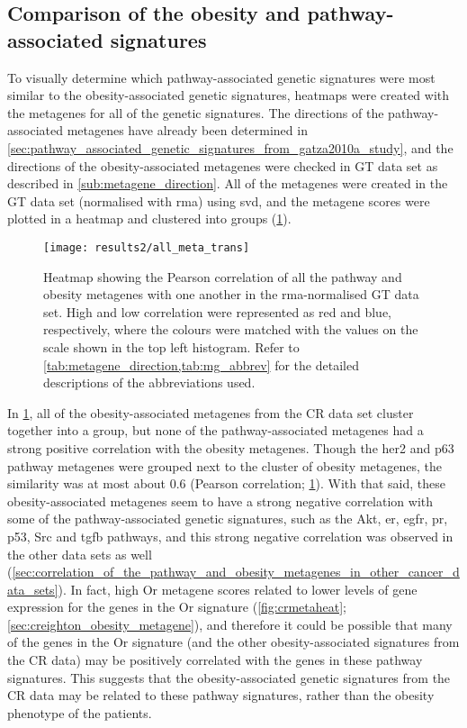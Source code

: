 \subsection{Comparison of the obesity and pathway-associated signatures}
\label{sub:comparison_of_the_obesity_and_pathway_associated_signatures}

To visually determine which pathway-associated genetic signatures were most similar to the obesity-associated genetic signatures, heatmaps were created with the metagenes for all of the genetic signatures.
The directions of the pathway-associated metagenes have already been determined in \cref{sec:pathway_associated_genetic_signatures_from_gatza2010a_study}, and the directions of the obesity-associated metagenes were checked in GT data set as described in \cref{sub:metagene_direction}.
All of the metagenes were created in the GT data set (normalised with \gls{rma}) using \gls{svd}, and the metagene scores were plotted in a heatmap and clustered into groups (\cref{fig:gatza_allmeta}).

\begin{figure}[tb]
	\centering
	\texttt{[image: results2/all\_meta\_trans]}
	\caption[Heatmap of the Pearson correlation of all the pathway and obesity metagenes with one another in the \acrshort{rma}-normalised GT data]{Heatmap showing the Pearson correlation of all the pathway and obesity metagenes  with one another  in the \gls{rma}-normalised GT data set.
		High and low correlation were represented as red and blue, respectively, where the colours were matched with the values on the scale shown in the top left histogram.
		Refer to \cref{tab:metagene_direction,tab:mg_abbrev} for the detailed descriptions of the abbreviations used.
		}
	\label{fig:gatza_allmeta}
\end{figure}

In \cref{fig:gatza_allmeta}, all of the obesity-associated metagenes from the CR data set cluster together into a group, but none of the pathway-associated metagenes had  a strong positive correlation with the obesity metagenes.
Though the  \gls{her2} and p63 pathway metagenes were grouped next to the cluster of obesity metagenes, the similarity was at most about 0.6  (Pearson correlation; \cref{fig:gatza_allmeta}).
With that said, these obesity-associated metagenes seem to have a strong negative correlation with some of the pathway-associated genetic signatures, such as the Akt, \gls{er}, \gls{egfr}, \gls{pr}, p53, Src and \gls{tgfb} pathways, and this strong negative correlation was observed in the other data sets as well (\cref{sec:correlation_of_the_pathway_and_obesity_metagenes_in_other_cancer_data_sets}).
In fact,  high Or metagene scores related to lower levels of gene expression for the genes in the Or signature (\cref{fig:crmetaheat}; \cref{sec:creighton_obesity_metagene}), and therefore it could be possible that many of the genes in the Or signature (and the other obesity-associated signatures from the CR data) may be positively correlated with the genes in these pathway signatures.
This suggests that the obesity-associated genetic signatures from the CR data may be related to these pathway signatures, rather than the obesity phenotype of the patients.


